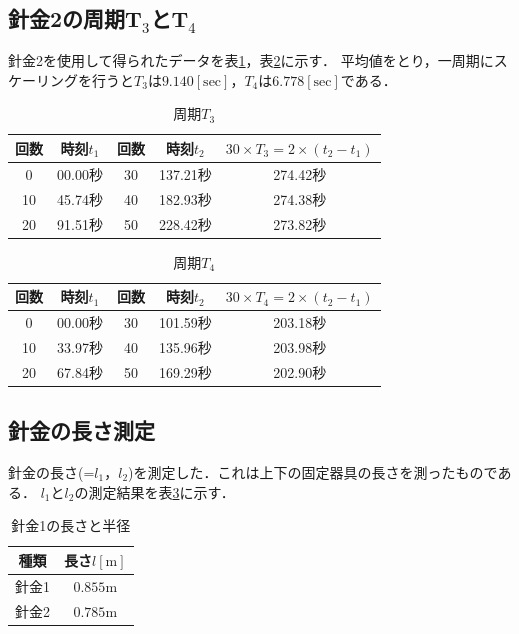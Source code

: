 \documentclass[a4paper,11pt]{ltjsarticle}
\begin{document}
\subsection{針金2の周期T$_3$とT$_4$}
針金2を使用して得られたデータを表\ref{tab:metal2T3}，表\ref{tab:metal2T4}に示す．
平均値をとり，一周期にスケーリングを行うと$T_3$は$9.140[\mathrm{sec}]$，$T_4$は$6.778[\mathrm{sec}]$である．
\begin{table}[H]
  \centering
  \caption{周期$T_3$}
  \label{tab:metal2T3}

  \begin{tabular}{c|c|c|c|c}
    \hline
    回数 & 時刻$t_1$ & 回数 & 時刻$t_2$ & $30 \times T_3 = 2 \times (t_2 - t_1)$ \\
    \hline
    0  & 00.00秒  & 30 & 137.21秒 & 274.42秒                                \\
    \hline
    10 & 45.74秒  & 40 & 182.93秒 & 274.38秒                                \\
    \hline
    20 & 91.51秒  & 50 & 228.42秒 & 273.82秒                                \\
    \hline
  \end{tabular}
\end{table}

\begin{table}[H]
  \centering
  \caption{周期$T_4$}
  \label{tab:metal2T4}

  \begin{tabular}{c|c|c|c|c}
    \hline
    回数 & 時刻$t_1$ & 回数 & 時刻$t_2$ & $30 \times T_4 = 2 \times (t_2 - t_1)$ \\
    \hline
    0  & 00.00秒  & 30 & 101.59秒 & 203.18秒                                \\
    \hline
    10 & 33.97秒  & 40 & 135.96秒 & 203.98秒                                \\
    \hline
    20 & 67.84秒  & 50 & 169.29秒 & 202.90秒                                \\
    \hline
  \end{tabular}
\end{table}
\subsection{針金の長さ測定}
針金の長さ(=$l_1$，$l_2$)を測定した．これは上下の固定器具の長さを測ったものである．
$l_1$と$l_2$の測定結果を表\ref{tab:metal1l1}に示す．
\begin{table}[H]
  \centering
  \caption{針金1の長さと半径}
  \label{tab:metal1l1}

  \begin{tabular}{c|c}
    \hline
    種類  & 長さ$l[\mathrm{m}]$ \\
    \hline
    針金1 & $0.855\mathrm{m}$ \\
    \hline
    針金2 & $0.785\mathrm{m}$ \\
    \hline
  \end{tabular}
\end{table}
\end{document}
